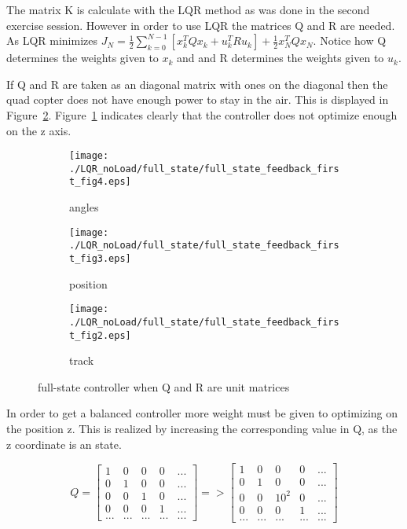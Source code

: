 The matrix K is calculate with the LQR method as was done in the second exercise session. However in order to use LQR the matrices Q and R are needed. As LQR minimizes $J_N = \frac{1}{2} \sum_{k=0}^{N-1}[x_k^TQx_k + u^T_kRu_k] + \frac{1}{2}x_N^TQx_N$. Notice how Q determines the weights given to $x_k$ and and R determines the weights given to $u_k$. 

If Q and R are taken as an diagonal matrix with ones on the diagonal then the quad copter does not have enough power to stay in the air. This is displayed in Figure~\ref{fig:full-state controller with simple diagonal matrices as Q and R}.  Figure~\ref{fig:full-state controller with simple diagonal matrices as Q and R demo bad z position} indicates clearly that the controller does not optimize enough on the z axis.
\begin{figure}[H]
	\centering
	\begin{subfigure}[b]{0.3\textwidth}
		\texttt{[image: ./LQR\_noLoad/full\_state/full\_state\_feedback\_first\_fig4.eps]}
		\caption{angles}
	\end{subfigure}
	\begin{subfigure}[b]{0.3\textwidth}
		\texttt{[image: ./LQR\_noLoad/full\_state/full\_state\_feedback\_first\_fig3.eps]}
		\caption{position}
		\label{fig:full-state controller with simple diagonal matrices as Q and R demo bad z position}
	\end{subfigure}
	\begin{subfigure}[b]{0.3\textwidth}
		\texttt{[image: ./LQR\_noLoad/full\_state/full\_state\_feedback\_first\_fig2.eps]}
		\caption{track}
	\end{subfigure}
	\caption{full-state controller when Q and R are unit matrices}\label{fig:full-state controller with simple diagonal matrices as Q and R}
\end{figure}

In order to get a balanced controller more weight must be given to optimizing on the position z. This is realized by increasing the corresponding value in Q, as the z coordinate is an state.

$$ 
Q=
\begin{bmatrix}
1 & 0 & 0 & 0 & ... \\
0 & 1 & 0 & 0 & ...\\
0 & 0 & 1 & 0 & ... \\
0 & 0 & 0 & 1 & ... \\
... & ... & ... & ... & ... 
\end{bmatrix}
=>
\begin{bmatrix}
1 & 0 & 0 & 0 & ... \\
0 & 1 & 0 & 0 & ...\\
0 & 0 & 10^2 & 0 & ... \\
0 & 0 & 0 & 1 & ... \\
... & ... & ... & ... & ... 
\end{bmatrix}
$$

